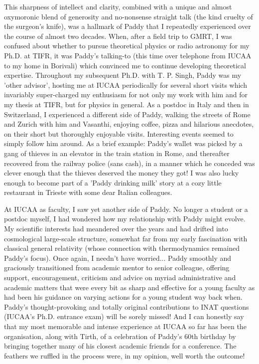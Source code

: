 \documentclass[prd, preprint, longbibliography, 12pt]{revtex4-2}
\begin{document}
This sharpness of intellect and clarity, combined with a unique and almost oxymoronic blend of generosity and no-nonsense straight talk (the kind cruelty of the surgeon's knife), was a hallmark of Paddy that I repeatedly experienced over the course of almost two decades. When, after a field trip to GMRT, I was confused about whether to pursue theoretical physics or radio astronomy for my Ph.D. at TIFR, it was Paddy's talking-to (this time over telephone from IUCAA to my home in Borivali) which convinced me to continue developing theoretical expertise. Throughout my subsequent Ph.D. with T. P. Singh, Paddy was my 'other advisor', hosting me at IUCAA periodically for several short visits which invariably super-charged my enthusiasm for not only my work with him and for my thesis at TIFR, but for physics in general. As a postdoc in Italy and then in Switzerland, I experienced a different side of Paddy, walking the streets of Rome and Zurich with him and Vasanthi, enjoying coffee, pizza and hilarious anecdotes, on their short but thoroughly enjoyable visits. Interesting events seemed to simply follow him around. As a brief example: Paddy's wallet was picked by a gang of thieves in an elevator in the train station in Rome, and thereafter recovered from the railway police (sans cash), in a manner which he conceded was clever enough that the thieves deserved the money they got! I was also lucky enough to become part of a 'Paddy drinking milk' story at a cozy little restaurant in Trieste with some dear Italian colleagues.

At IUCAA as faculty, I saw yet another side of Paddy. No longer a student or a postdoc myself, I had wondered how my relationship with Paddy might evolve. My scientific interests had meandered over the years and had drifted into cosmological large-scale structure, somewhat far from my early fascination with classical general relativity (whose connection with thermodynamics remained Paddy's focus). Once again, I needn't have worried... Paddy smoothly and graciously transitioned from academic mentor to senior colleague, offering support, encouragement, criticism and advice on myriad administrative and academic matters that were every bit as sharp and effective for a young faculty as had been his guidance on varying actions for a young student way back when. Paddy's thought-provoking and totally original contributions to INAT questions (IUCAA's Ph.D. entrance exam) will be sorely missed! And I can honestly say that my most memorable and intense experience at IUCAA so far has been the organisation, along with Tirth, of a celebration of Paddy's 60th birthday by bringing together many of his closest academic friends for a conference. The feathers we ruffled in the process were, in my opinion, well worth the outcome! 
\end{document}
